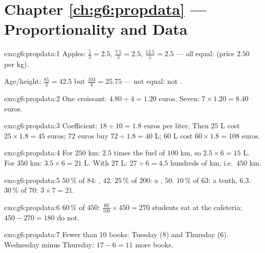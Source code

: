 \section*{Chapter \ref{ch:g6:propdata} --- Proportionality and Data}

\begin{solution}{exo:g6:propdata:1}
Apples:  $\frac52 = 2.5$, $\frac{7.5}{3} = 2.5$,
$\frac{12.5}{5} = 2.5$ --- all equal:  (price
$2.50$ per kg).

Age/height: $\frac{85}{2} = 42.5$ but $\frac{103}{4} = 25.75$ --- not
equal: not .
\end{solution}

\begin{solution}{exo:g6:propdata:2}
One croissant: $4.80 \div 4 = 1.20$ euros. Seven:
$7 \times 1.20 = 8.40$ euros.
\end{solution}

\begin{solution}{exo:g6:propdata:3}
Coefficient: $18 \div 10 = 1.8$ euros per liter. Then
$25$ L cost $25 \times 1.8 = 45$ euros; $72$ euros buy
$72 \div 1.8 = 40$ L; $60$ L cost $60 \times 1.8 = 108$ euros.
\end{solution}

\begin{solution}{exo:g6:propdata:4}
For $250$ km: $2.5$ times the fuel of $100$ km, so
$2.5 \times 6 = 15$ L. For $350$ km: $3.5 \times 6 = 21$ L. With
$27$ L: $27 \div 6 = 4.5$ hundreds of km, i.e.\ $450$ km.
\end{solution}

\begin{solution}{exo:g6:propdata:5}
$50\,\%$ of $84$: , $42$. \quad
$25\,\%$ of $200$: a , $50$. \quad
$10\,\%$ of $63$: a tenth, $6.3$. \quad
$30\,\%$ of $70$: $3 \times 7 = 21$.
\end{solution}

\begin{solution}{exo:g6:propdata:6}
$60\,\%$ of $450$: $\frac{60}{100} \times 450 = 270$ students eat at
the cafeteria; $450 - 270 = 180$ do not.
\end{solution}

\begin{solution}{exo:g6:propdata:7}
Fewer than $10$ books: Tuesday ($8$) and Thursday ($6$). Wednesday
minus Thursday: $17 - 6 = 11$ more books.
\end{solution}

